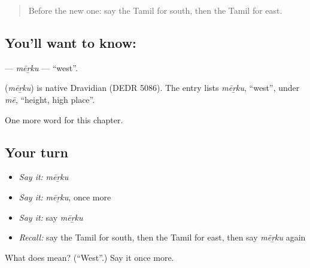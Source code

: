 \label{lesson:TA-C235-merku}



\begin{quote}
Before the new one: say the Tamil for south, then the Tamil for east.
\end{quote}

\subsection*{You'll want to know: }
\textbf{} — \emph{mēṟku} — \textquotedblleft{}west\textquotedblright{}.

\begin{cousinweb}
\textbf{} (\emph{mēṟku}) is native Dravidian (DEDR 5086). The entry lists \emph{mēṟku}, \textquotedblleft{}west\textquotedblright{}, under \emph{mē}, \textquotedblleft{}height, high place\textquotedblright{}.
\end{cousinweb}

\begin{grammarlens}[title={What you've built}]
One more word for this chapter.
\end{grammarlens}

\subsection*{Your turn}
\begin{itemize}
\raggedright
  \item \emph{Say it:} \emph{mēṟku}
  \item \emph{Say it:} \emph{mēṟku}, once more
  \item \emph{Say it:} say \emph{mēṟku}
  \item \emph{Recall:} say the Tamil for south, then the Tamil for east, then say \emph{mēṟku} again
\end{itemize}

\begin{tcolorbox}[breakable,colback=teal!4,colframe=teal!35!black,title={Before you move on}]
What does  mean? (\textquotedblleft{}West\textquotedblright{}.) Say it once more.
\end{tcolorbox}
